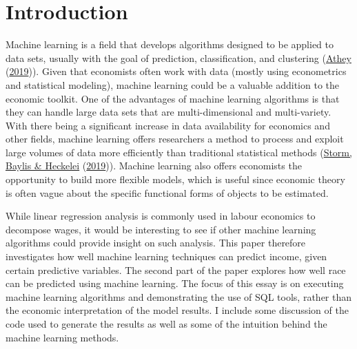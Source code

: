 \documentclass[11pt,preprint, authoryear]{elsarticle}
\numberwithin{equation}{section}
\numberwithin{figure}{section}
\numberwithin{table}{section}
\begin{document}
\renewcommand{\contentsname}{Table of Contents}
{\tableofcontents}

\pagestyle{fancy}
\chead{}
\rhead{}
\lfoot{}
\lhead{}
\cfoot{}


\headsep 35pt %




\newpage

\hypertarget{introduction}{%
\section{\texorpdfstring{Introduction
\label{Introduction}}{Introduction }}\label{introduction}}

Machine learning is a field that develops algorithms designed to be
applied to data sets, usually with the goal of prediction,
classification, and clustering (\protect\hyperlink{ref-eco}{Athey}
(\protect\hyperlink{ref-eco}{2019})). Given that economists often work
with data (mostly using econometrics and statistical modeling), machine
learning could be a valuable addition to the economic toolkit. One of
the advantages of machine learning algorithms is that they can handle
large data sets that are multi-dimensional and multi-variety. With there
being a significant increase in data availability for economics and
other fields, machine learning offers researchers a method to process
and exploit large volumes of data more efficiently than traditional
statistical methods (\protect\hyperlink{ref-ecoml}{Storm, Baylis \&
Heckelei} (\protect\hyperlink{ref-ecoml}{2019})). Machine learning also
offers economists the opportunity to build more flexible models, which
is useful since economic theory is often vague about the specific
functional forms of objects to be estimated.

While linear regression analysis is commonly used in labour economics to
decompose wages, it would be interesting to see if other machine
learning algorithms could provide insight on such analysis. This paper
therefore investigates how well machine learning techniques can predict
income, given certain predictive variables. The second part of the paper
explores how well race can be predicted using machine learning. The
focus of this essay is on executing machine learning algorithms and
demonstrating the use of SQL tools, rather than the economic
interpretation of the model results. I include some discussion of the
code used to generate the results as well as some of the intuition
behind the machine learning methods.
\end{document}
